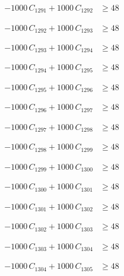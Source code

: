 \documentclass[a4paper,11pt]{article}
\begin{document}
\begin{align}
-1000\,C_{1291} + 1000\,C_{1292} &\geq 48 \nonumber
\end{align}

\begin{align}
-1000\,C_{1292} + 1000\,C_{1293} &\geq 48 \nonumber
\end{align}

\begin{align}
-1000\,C_{1293} + 1000\,C_{1294} &\geq 48 \nonumber
\end{align}

\begin{align}
-1000\,C_{1294} + 1000\,C_{1295} &\geq 48 \nonumber
\end{align}

\begin{align}
-1000\,C_{1295} + 1000\,C_{1296} &\geq 48 \nonumber
\end{align}

\begin{align}
-1000\,C_{1296} + 1000\,C_{1297} &\geq 48 \nonumber
\end{align}

\begin{align}
-1000\,C_{1297} + 1000\,C_{1298} &\geq 48 \nonumber
\end{align}

\begin{align}
-1000\,C_{1298} + 1000\,C_{1299} &\geq 48 \nonumber
\end{align}

\begin{align}
-1000\,C_{1299} + 1000\,C_{1300} &\geq 48 \nonumber
\end{align}

\begin{align}
-1000\,C_{1300} + 1000\,C_{1301} &\geq 48 \nonumber
\end{align}

\begin{align}
-1000\,C_{1301} + 1000\,C_{1302} &\geq 48 \nonumber
\end{align}

\begin{align}
-1000\,C_{1302} + 1000\,C_{1303} &\geq 48 \nonumber
\end{align}

\begin{align}
-1000\,C_{1303} + 1000\,C_{1304} &\geq 48 \nonumber
\end{align}

\begin{align}
-1000\,C_{1304} + 1000\,C_{1305} &\geq 48 \nonumber
\end{align}
\end{document}
